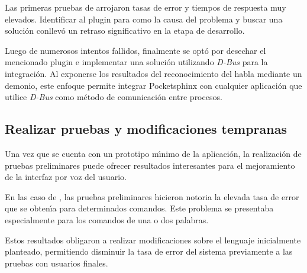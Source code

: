 Las primeras pruebas de  arrojaron tasas de error y tiempos de
respuesta muy elevados. Identificar al plugin para  como la causa del problema
y buscar una soluci\'on conllev\'o un retraso significativo en la etapa de desarrollo.

Luego de numerosos intentos fallidos, finalmente se opt\'o por desechar el mencionado plugin
e implementar una soluci\'on utilizando \emph{D-Bus} para la integraci\'on. Al exponerse los
resultados del reconocimiento del habla mediante un demonio, este enfoque permite integrar
Pocketsphinx con cualquier aplicaci\'on que utilice \emph{D-Bus} como m\'etodo de comunicaci\'on
entre procesos.

\subsection{Realizar pruebas y modificaciones tempranas}
Una vez que se cuenta con un prototipo m{\'\i}nimo de la aplicaci\'on, la realizaci\'on de pruebas preliminares
puede ofrecer resultados interesantes para el mejoramiento de la 
interfaz por voz del usuario.

En las caso de , las pruebas preliminares hicieron notoria la elevada tasa
de error que se obten{\'\i}a para determinados comandos. Este problema se presentaba especialmente para
los comandos de una o dos palabras.

Estos resultados obligaron a realizar modificaciones sobre el lenguaje inicialmente planteado,
permitiendo disminuir la tasa de error del sistema previamente a las pruebas con usuarios
finales.